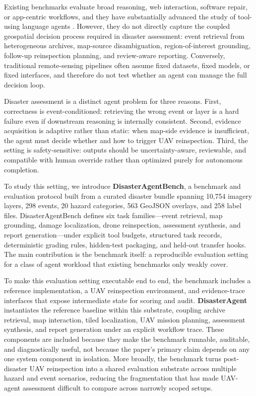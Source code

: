 \documentclass{article}
\newcommand{\datasetfiles}{10{,}754}
\newcommand{\datasetevents}{298}
\newcommand{\datasethazards}{20}
\newcommand{\datasetgeojson}{563}
\newcommand{\datasetlabels}{258}
\begin{document}
Existing benchmarks evaluate broad reasoning, web interaction, software repair, or app-centric workflows, and they have substantially advanced the study of tool-using language agents \citep{liu2024agentbench, mialon2024gaia, deng2023mind2web, zhou2023webarena, xie2024osworld, jimenez2024swe_bench, yao2024tau_bench, trivedi2024appworld}. However, they do not directly capture the coupled geospatial decision process required in disaster assessment: event retrieval from heterogeneous archives, map-source disambiguation, region-of-interest grounding, follow-up reinspection planning, and review-aware reporting. Conversely, traditional remote-sensing pipelines often assume fixed datasets, fixed models, or fixed interfaces, and therefore do not test whether an agent can manage the full decision loop.

Disaster assessment is a distinct agent problem for three reasons. First, correctness is event-conditioned: retrieving the wrong event or layer is a hard failure even if downstream reasoning is internally consistent. Second, evidence acquisition is adaptive rather than static: when map-side evidence is insufficient, the agent must decide whether and how to trigger UAV reinspection. Third, the setting is safety-sensitive: outputs should be uncertainty-aware, reviewable, and compatible with human override rather than optimized purely for autonomous completion.

To study this setting, we introduce \textbf{DisasterAgentBench}, a benchmark and evaluation protocol built from a curated disaster bundle spanning \datasetfiles{} imagery layers, \datasetevents{} events, \datasethazards{} hazard categories, \datasetgeojson{} GeoJSON overlays, and \datasetlabels{} label files. DisasterAgentBench defines six task families---event retrieval, map grounding, damage localization, drone reinspection, assessment synthesis, and report generation---under explicit tool budgets, structured task records, deterministic grading rules, hidden-test packaging, and held-out transfer hooks. The main contribution is the benchmark itself: a reproducible evaluation setting for a class of agent workload that existing benchmarks only weakly cover.

To make this evaluation setting executable end to end, the benchmark includes a reference implementation, a UAV reinspection environment, and evidence-trace interfaces that expose intermediate state for scoring and audit. \textbf{DisasterAgent} instantiates the reference baseline within this substrate, coupling archive retrieval, map interaction, tiled localization, UAV mission planning, assessment synthesis, and report generation under an explicit workflow trace. These components are included because they make the benchmark runnable, auditable, and diagnostically useful, not because the paper's primary claim depends on any one system component in isolation. More broadly, the benchmark turns post-disaster UAV reinspection into a shared evaluation substrate across multiple hazard and event scenarios, reducing the fragmentation that has made UAV-agent assessment difficult to compare across narrowly scoped setups.
\end{document}

